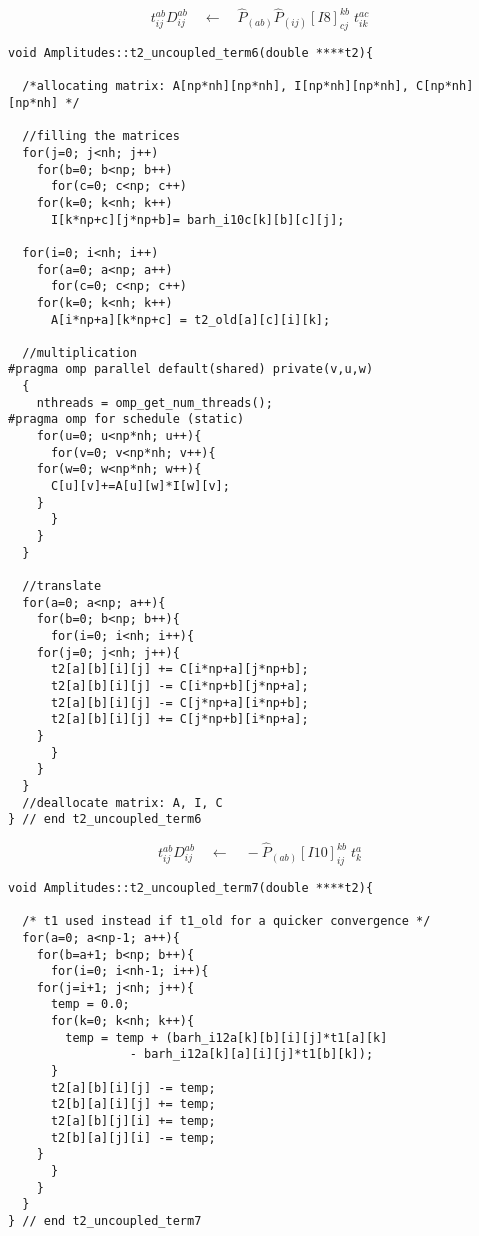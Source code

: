 \begin{equation*}
t_{ij}^{ab}D_{ij}^{ab}\quad \leftarrow \quad\hat{P}_{(ab)}\hat{P}_{(ij)}[I8]_{cj}^{kb}\phantom{.}t_{ik}^{ac}
\end{equation*}

\begin{lstlisting}[label={list:impl:t2term6},caption={implementation of the amp1 class function t2\_uncoupled\_term6()}]
void Amplitudes::t2_uncoupled_term6(double ****t2){
  
  /*allocating matrix: A[np*nh][np*nh], I[np*nh][np*nh], C[np*nh][np*nh] */

  //filling the matrices
  for(j=0; j<nh; j++)
    for(b=0; b<np; b++)
      for(c=0; c<np; c++)
	for(k=0; k<nh; k++)
	  I[k*np+c][j*np+b]= barh_i10c[k][b][c][j];

  for(i=0; i<nh; i++)
    for(a=0; a<np; a++)
      for(c=0; c<np; c++)
	for(k=0; k<nh; k++)
	  A[i*np+a][k*np+c] = t2_old[a][c][i][k];

  //multiplication
#pragma omp parallel default(shared) private(v,u,w) 
  {      
    nthreads = omp_get_num_threads();
#pragma omp for schedule (static)
    for(u=0; u<np*nh; u++){
      for(v=0; v<np*nh; v++){
	for(w=0; w<np*nh; w++){
	  C[u][v]+=A[u][w]*I[w][v];
	}
      }
    }
  }

  //translate
  for(a=0; a<np; a++){
    for(b=0; b<np; b++){
      for(i=0; i<nh; i++){
	for(j=0; j<nh; j++){
	  t2[a][b][i][j] += C[i*np+a][j*np+b];
	  t2[a][b][i][j] -= C[i*np+b][j*np+a];
	  t2[a][b][i][j] -= C[j*np+a][i*np+b];
	  t2[a][b][i][j] += C[j*np+b][i*np+a];
	}
      }
    }
  }
  //deallocate matrix: A, I, C 
} // end t2_uncoupled_term6
\end{lstlisting}

\begin{equation*}
t_{ij}^{ab}D_{ij}^{ab}\quad \leftarrow \quad-\hat{P}_{(ab)}[I10]_{ij}^{kb}\phantom{.}t_{k}^{a} 
\end{equation*}

\begin{lstlisting}[label={list:impl:t2term7},caption={implementation of the amp1 class function t2\_uncoupled\_term7()}]
void Amplitudes::t2_uncoupled_term7(double ****t2){
  
  /* t1 used instead if t1_old for a quicker convergence */
  for(a=0; a<np-1; a++){
    for(b=a+1; b<np; b++){
      for(i=0; i<nh-1; i++){
	for(j=i+1; j<nh; j++){	
	  temp = 0.0;
	  for(k=0; k<nh; k++){
	    temp = temp + (barh_i12a[k][b][i][j]*t1[a][k] 
                 - barh_i12a[k][a][i][j]*t1[b][k]); 
	  }
	  t2[a][b][i][j] -= temp;
	  t2[b][a][i][j] += temp;
	  t2[a][b][j][i] += temp;
	  t2[b][a][j][i] -= temp;
	}
      }
    }
  }
} // end t2_uncoupled_term7
\end{lstlisting}

